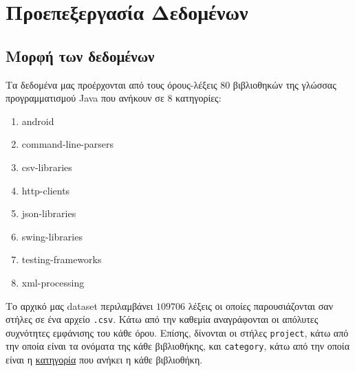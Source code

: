 \chapter{Προεπεξεργασία Δεδομένων}
\section{Μορφή των δεδομένων}
Τα δεδομένα μας προέρχονται από τους όρους-λέξεις 80 βιβλιοθηκών της γλώσσας προγραμματισμού Java που ανήκουν σε 8 κατηγορίες:
\begin{enumerate}\label{itemize:categories}
    \item android
    \item command-line-parsers
    \item csv-libraries
    \item http-clients
    \item json-libraries
    \item swing-libraries
    \item testing-frameworks
    \item xml-processing
\end{enumerate}

Το αρχικό μας dataset περιλαμβάνει $109706$ λέξεις οι οποίες παρουσιάζονται σαν στήλες σε ένα αρχείο \texttt{.csv}.
Κάτω από την καθεμία αναγράφονται οι απόλυτες συχνότητες εμφάνισης του κάθε όρου.
Επίσης, δίνονται οι στήλες \texttt{project}, κάτω από την οποία είναι τα ονόματα της κάθε βιβλιοθήκης, και \texttt{category}, κάτω από την οποία είναι η
\hyperref[itemize:categories]{κατηγορία} που ανήκει η κάθε βιβλιοθήκη.

